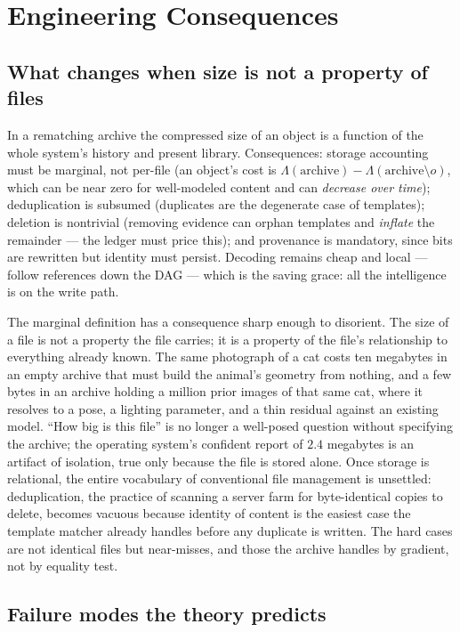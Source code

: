 \documentclass[11pt,oneside]{book}
\theoremstyle{remark}
\begin{document}
\chapter{Engineering Consequences}

\section{What changes when size is not a property of files}

In a rematching archive the compressed size of an object is a function
of the whole system's history and present library. Consequences:
storage accounting must be marginal, not per-file (an object's cost is
$\Lambda(\text{archive}) - \Lambda(\text{archive} \setminus o)$, which
can be near zero for well-modeled content and can \emph{decrease over
time}); deduplication is subsumed (duplicates are the degenerate case
of templates); deletion is nontrivial (removing evidence can orphan
templates and \emph{inflate} the remainder --- the ledger must price
this); and provenance is mandatory, since bits are rewritten but
identity must persist. Decoding remains cheap and local --- follow
references down the DAG --- which is the saving grace: all the
intelligence is on the write path.

The marginal definition has a consequence sharp enough to disorient.
The size of a file is not a property the file carries; it is a property
of the file's relationship to everything already known. The same
photograph of a cat costs ten megabytes in an empty archive that must
build the animal's geometry from nothing, and a few bytes in an archive
holding a million prior images of that same cat, where it resolves to a
pose, a lighting parameter, and a thin residual against an existing
model. ``How big is this file'' is no longer a well-posed question
without specifying the archive; the operating system's confident report
of $2.4$ megabytes is an artifact of isolation, true only because the
file is stored alone. Once storage is relational, the entire vocabulary
of conventional file management is unsettled: deduplication, the
practice of scanning a server farm for byte-identical copies to delete,
becomes vacuous because identity of content is the easiest case the
template matcher already handles before any duplicate is written. The
hard cases are not identical files but near-misses, and those the
archive handles by gradient, not by equality test.

\section{Failure modes the theory predicts}
\end{document}
